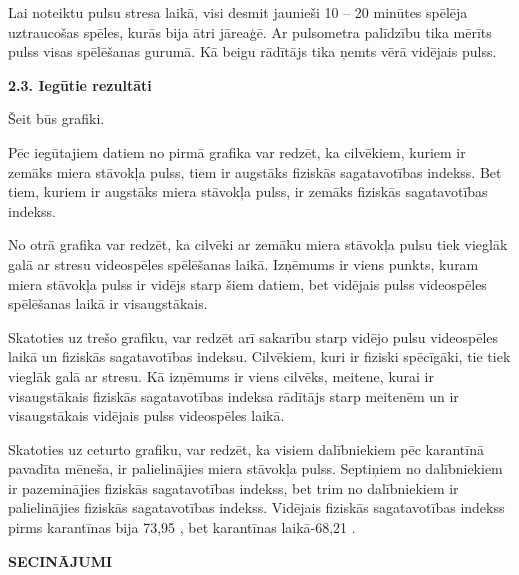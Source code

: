 \documentclass[12pt]{article}
\begin{document}
Lai noteiktu pulsu stresa laikā, visi desmit jaunieši 10 – 20 minūtes spēlēja uztraucošas spēles, kurās bija ātri jāreaģē. Ar pulsometra palīdzību tika mērīts pulss visas spēlēšanas gurumā. Kā beigu rādītājs tika ņemts vērā vidējais pulss.

\begin{center}
{\bf 2.3. Iegūtie rezultāti}
\end{center}
Šeit būs grafiki.

Pēc iegūtajiem datiem no pirmā grafika var redzēt, ka cilvēkiem, kuriem ir zemāks miera stāvokļa pulss, tiem ir augstāks fiziskās sagatavotības indekss. Bet tiem, kuriem ir augstāks miera stāvokļa pulss, ir zemāks fiziskās sagatavotības indekss. \par
No otrā grafika var redzēt, ka cilvēki ar zemāku miera stāvokļa pulsu tiek vieglāk galā ar stresu videospēles spēlēšanas laikā. Izņēmums ir viens punkts, kuram miera stāvokļa pulss ir vidējs starp šiem datiem, bet vidējais pulss videospēles spēlēšanas laikā ir visaugstākais. \par
Skatoties uz trešo grafiku, var redzēt arī sakarību starp vidējo pulsu videospēles laikā un fiziskās sagatavotības indeksu. Cilvēkiem, kuri ir fiziski spēcīgāki, tie tiek vieglāk galā ar stresu. Kā izņēmums ir viens cilvēks, meitene, kurai ir visaugstākais fiziskās sagatavotības indeksa rādītājs starp meitenēm un ir visaugstākais vidējais pulss videospēles laikā. \par
Skatoties uz ceturto grafiku, var redzēt, ka visiem dalībniekiem pēc karantīnā pavadīta mēneša, ir palielinājies miera stāvokļa pulss. Septiņiem no dalībniekiem ir pazeminājies fiziskās sagatavotības indekss, bet trim no dalībniekiem ir palielinājies fiziskās sagatavotības indekss. Vidējais fiziskās sagatavotības indekss pirms karantīnas bija 73,95 , bet karantīnas laikā-68,21 .

\newpage
\begin{center}
{\large \bf SECINĀJUMI}
\end{center}
\end{document}
